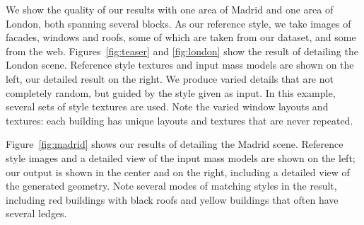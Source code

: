 We show the quality of our results with one area of Madrid and one area of London, both spanning several blocks. As our reference style, we take images of facades, windows and roofs, some of which are taken from our dataset, and some from the web. Figures~\ref{fig:teaser} and \ref{fig:london} show the result of detailing the London scene. Reference style textures and input mass models are shown on the left, our detailed result on the right. We produce varied details that are not completely random, but guided by the style given as input. In this example, several sets of style textures are used. Note the varied window layouts and textures: each building has unique layouts and textures that are never repeated. 

Figure~\ref{fig:madrid} shows our results of detailing the Madrid scene. Reference style images and a detailed view of the input mass models are shown on the left; our output is shown in the center and on the right, including a detailed view of the generated geometry. Note several modes of matching styles in the result, including red buildings with black roofs and yellow buildings that often have several ledges.

